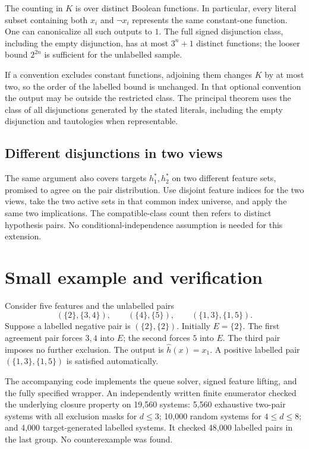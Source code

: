 \documentclass[11pt,a4paper]{article}
\begin{document}
The counting in \(K\) is over distinct Boolean functions. In particular,
every literal subset containing both \(x_i\) and \(\neg x_i\) represents
the same constant-one function. One can canonicalize all such outputs to
\(1\). The full signed disjunction class, including the empty disjunction,
has at most \(3^n+1\) distinct functions; the looser bound \(2^{2n}\) is
sufficient for the unlabelled sample.

If a convention excludes constant functions, adjoining them changes
\(K\) by at most two, so the order of the labelled bound is unchanged.
In that optional convention the output may be outside the restricted
class. The principal theorem uses the class of all disjunctions generated
by the stated literals, including the empty disjunction and tautologies
when representable.

\subsection{Different disjunctions in two views}

The same argument also covers targets \(h_1^*,h_2^*\) on two different
feature sets, promised to agree on the pair distribution.
Use disjoint feature indices for the two views, take the two active sets
in that common index universe, and apply the same two implications.
The compatible-class count then refers to distinct hypothesis pairs.
No conditional-independence assumption is needed for this extension.

\section{Small example and verification}

Consider five features and the unlabelled pairs
\[
 (\{2\},\{3,4\}),\qquad
 (\{4\},\{5\}),\qquad
 (\{1,3\},\{1,5\}).
\]
Suppose a labelled negative pair is \((\{2\},\{2\})\).
Initially \(E=\{2\}\).
The first agreement pair forces \(3,4\) into \(E\);
the second forces \(5\) into \(E\).
The third pair imposes no further exclusion. The output is
\(\widehat h(x)=x_1\). A positive labelled pair
\((\{1,3\},\{1,5\})\) is satisfied automatically.

The accompanying code implements the queue solver, signed feature lifting,
and the fully specified wrapper. An independently written finite enumerator
checked the underlying closure property on 19,560 systems:
5,560 exhaustive two-pair systems with all exclusion masks for \(d\le3\);
10,000 random systems for \(4\le d\le8\); and 4,000 target-generated
labelled systems. It checked 48,000 labelled pairs in the last group.
No counterexample was found.
\end{document}
